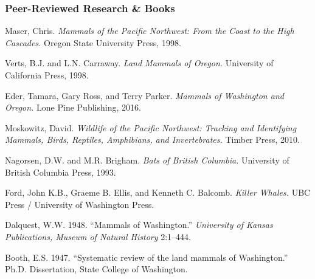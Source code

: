 \documentclass[11pt,letterpaper]{article}
\begin{document}
\subsubsection{Peer-Reviewed Research \& Books}
\begin{enumerate}[leftmargin=2em, label={[P\arabic*]}]
\item Maser, Chris. \textit{Mammals of the Pacific Northwest: From the Coast to the High Cascades.} Oregon State University Press, 1998.
\item Verts, B.J. and L.N. Carraway. \textit{Land Mammals of Oregon.} University of California Press, 1998.
\item Eder, Tamara, Gary Ross, and Terry Parker. \textit{Mammals of Washington and Oregon.} Lone Pine Publishing, 2016.
\item Moskowitz, David. \textit{Wildlife of the Pacific Northwest: Tracking and Identifying Mammals, Birds, Reptiles, Amphibians, and Invertebrates.} Timber Press, 2010.
\item Nagorsen, D.W. and M.R. Brigham. \textit{Bats of British Columbia.} University of British Columbia Press, 1993.
\item Ford, John K.B., Graeme B. Ellis, and Kenneth C. Balcomb. \textit{Killer Whales.} UBC Press / University of Washington Press.
\item Dalquest, W.W. 1948. ``Mammals of Washington.'' \textit{University of Kansas Publications, Museum of Natural History} 2:1--444.
\item Booth, E.S. 1947. ``Systematic review of the land mammals of Washington.'' Ph.D. Dissertation, State College of Washington.
\end{enumerate}
\end{document}
